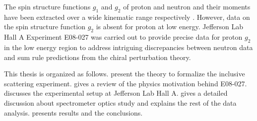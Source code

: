 The spin structure functions $g_1$ and $g_2$ of proton and neutron and their moments have been extracted over a wide kinematic range respectively \cite{Amarian2002,Amarian2004a,Amarian2004b,Wesselmann2007,Fatemi2003,Yun2003,Deur2004,Dharmawardane2004,Chen2004}. However, data on the spin structure function $g_2$ is absent for proton at low energy. Jefferson Lab Hall A Experiment E08-027 was carried out to provide precise data for proton $g_2$ in the low energy region to address intriguing discrepancies between neutron data and sum rule predictions from the chiral perturbation theory.

This thesis is organized as follows.  present the theory to formalize the inclusive scattering experiment.  gives a review of the physics motivation behind E08-027.  discusses the experimental setup at Jefferson Lab Hall A.  gives a detailed discussion about spectrometer optics study and  explains the rest of the data analysis.  presents results and the conclusions.

